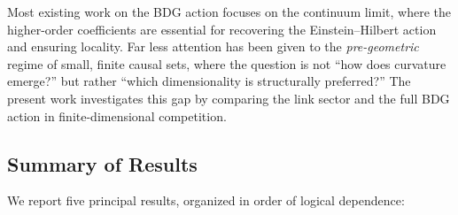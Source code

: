 \documentclass[12pt,a4paper]{article}
\begin{document}
Most existing work on the BDG action focuses on the continuum limit, where the
higher-order coefficients are essential for recovering the Einstein--Hilbert action
and ensuring locality.  Far less attention has been given to the \emph{pre-geometric}
regime of small, finite causal sets, where the question is not ``how does curvature
emerge?''  but rather ``which dimensionality is structurally preferred?''
The present work investigates this gap by comparing the link sector and the full
BDG action in finite-dimensional competition.

\subsection{Summary of Results}
\label{sec:summary_results}

We report five principal results, organized in order of logical dependence:
\end{document}
